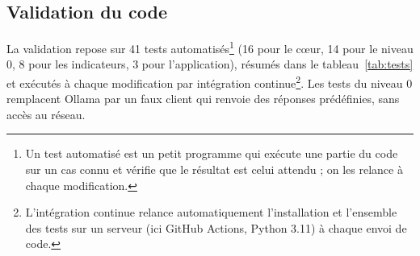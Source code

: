 \documentclass[11pt,a4paper]{article}
\begin{document}
\subsection{Validation du code}\label{sec:tests}

La validation repose sur 41 tests automatisés\footnote{Un test automatisé est un petit programme qui exécute une partie du code sur un cas connu et vérifie que le résultat est celui attendu ; on les relance à chaque modification.} (16 pour le cœur, 14 pour le niveau 0, 8 pour les indicateurs, 3 pour l'application), résumés dans le tableau~\ref{tab:tests} et exécutés à chaque modification par intégration continue\footnote{L'intégration continue relance automatiquement l'installation et l'ensemble des tests sur un serveur (ici GitHub Actions, Python 3.11) à chaque envoi de code.}. Les tests du niveau 0 remplacent Ollama par un faux client qui renvoie des réponses prédéfinies, sans accès au réseau.
\end{document}
